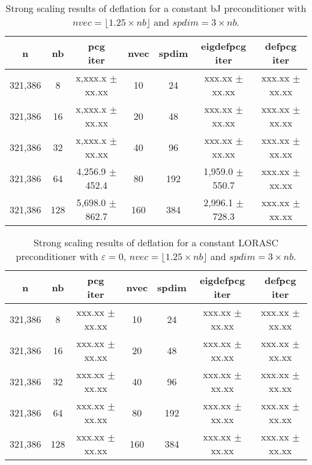 \documentclass{article}
\begin{document}


\begin{table}[ht]
	\caption{Strong scaling results of deflation for a constant bJ preconditioner with $nvec=\lfloor1.25\times nb\rfloor$ and $spdim=3\times nb$.}
	\centering
	\begin{tabular}{|c|c|c|c|c|c|c|}
		\hline
		n & nb & \makecell{pcg\\ iter} & nvec & spdim & \makecell{eigdefpcg\\ iter} & \makecell{defpcg\\ iter}\\
		\hline
		321,386 &   8 & x,xxx.x $\pm$ xx.xx &  10 &  24 & xxx.xx $\pm$ xx.xx & xxx.xx $\pm$ xx.xx \\
        321,386 &  16 & x,xxx.x $\pm$ xx.xx &  20 &  48 & xxx.xx $\pm$ xx.xx & xxx.xx $\pm$ xx.xx \\
        321,386 &  32 & x,xxx.x $\pm$ xx.xx &  40 &  96 & xxx.xx $\pm$ xx.xx & xxx.xx $\pm$ xx.xx \\
        321,386 &  64 & 4,256.9 $\pm$ 452.4 &  80 & 192 & 1,959.0 $\pm$ 550.7 & xxx.xx $\pm$ xx.xx \\
		321,386 & 128 & 5,698.0 $\pm$ 862.7 & 160 & 384 & 2,996.1 $\pm$ 728.3 & xxx.xx $\pm$ xx.xx \\
		\hline
	\end{tabular}
	\label{Tab:030}
\end{table}


\begin{table}[ht]
	\caption{Strong scaling results of deflation for a constant LORASC preconditioner with $\varepsilon=0$, $nvec=\lfloor1.25\times nb\rfloor$ and $spdim=3\times nb$.}
	\centering
	\begin{tabular}{|c|c|c|c|c|c|c|}
		\hline
		n & nb & \makecell{pcg\\ iter} & nvec & spdim & \makecell{eigdefpcg\\ iter} & \makecell{defpcg\\ iter}\\
		\hline
		321,386 &   8 & xxx.xx $\pm$ xx.xx &  10 &  24 & xxx.xx $\pm$ xx.xx & xxx.xx $\pm$ xx.xx \\
		321,386 &  16 & xxx.xx $\pm$ xx.xx &  20 &  48 & xxx.xx $\pm$ xx.xx & xxx.xx $\pm$ xx.xx \\
		321,386 &  32 & xxx.xx $\pm$ xx.xx &  40 &  96 & xxx.xx $\pm$ xx.xx & xxx.xx $\pm$ xx.xx \\
		321,386 &  64 & xxx.xx $\pm$ xx.xx &  80 & 192 & xxx.xx $\pm$ xx.xx & xxx.xx $\pm$ xx.xx \\
		321,386 & 128 & xxx.xx $\pm$ xx.xx & 160 & 384 & xxx.xx $\pm$ xx.xx & xxx.xx $\pm$ xx.xx \\
		\hline
	\end{tabular}
	\label{Tab:035}
\end{table}
\end{document}
